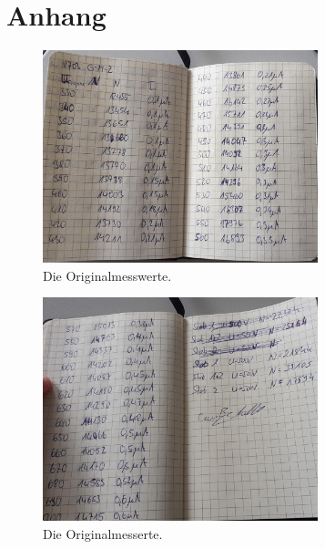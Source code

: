 \section*{Anhang}
\label{sec:anhang}
\begin{figure}[h]
    \centering
    \includegraphics[width = 8cm]{content/mess1.jpg}
    \caption{Die Originalmesswerte.}
    \label{fig:mess1}
  \end{figure}

  \begin{figure}[h]
    \centering
    \includegraphics[width = 8cm]{content/mess2.jpg}
    \caption{Die Originalmesserte.}
    \label{fig:mess2}
  \end{figure}
